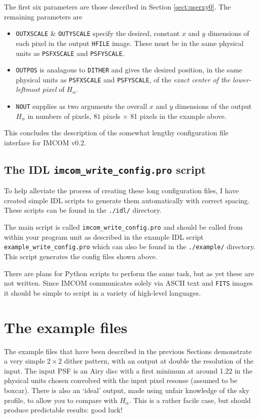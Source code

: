 \documentclass[10pt]{article}
\begin{document}
The first six parameters are those described in Section \ref{sect:userxy0}. The remaining parameters are
\begin{itemize}
\item \texttt{OUTXSCALE} \& \texttt{OUTYSCALE} specify the desired, constant $x$ and $y$ dimensions of each pixel in the output \texttt{HFILE} image. These must be in the same physical units as \texttt{PSFXSCALE} and \texttt{PSFYSCALE}.
\item \texttt{OUTPOS} is analagous to \texttt{DITHER} and gives the desired position, in the same physical units as \texttt{PSFXSCALE} and \texttt{PSFYSCALE}, of the \emph{exact center of the lower-leftmost pixel} of $H_{\alpha}$.
\item \texttt{NOUT} supplies as two arguments the overall $x$ and $y$ dimensions of the output $H_{\alpha}$ in numbers of pixels, $81$ pixels $\times$ 81 pixels in the example above.
\end{itemize}

This concludes the description of the somewhat lengthy configuration file interface for IMCOM v0.2.  

\subsection{The IDL \texttt{imcom\_write\_config.pro} script}\label{sect:idl}
To help alleviate the process of creating these long configuration files, I have created simple IDL scripts to generate them automatically with correct spacing.  These scripts can be found in the \texttt{./idl/} directory. 

The main script is called \texttt{imcom\_write\_config.pro} and should be called from within your program unit as described in the example IDL script \texttt{example\_write\_config.pro} which can also be found in the \texttt{./example/} directory.  This script generates the config files shown above.

There are plans for Python scripts to perform the same task, but as yet these are not written.  Since IMCOM communicates solely via ASCII text and \texttt{FITS} images it should be simple to script in a variety of high-level languages.

\section{The example files}
The example files that have been described in the previous Sections demonstrate a very simple $2 \times 2$ dither pattern, with an output at double the resolution of the input.  The input PSF is an Airy disc with a first minimum at around 1.22 in the physical units chosen convolved with the input pixel resonse (assumed to be boxcar).  There is also an `ideal' output, made using unfair knowledge of the sky profile, to allow you to compare with $H_{\alpha}$.  This is a rather facile case, but should produce predictable results: good luck!
\end{document}

